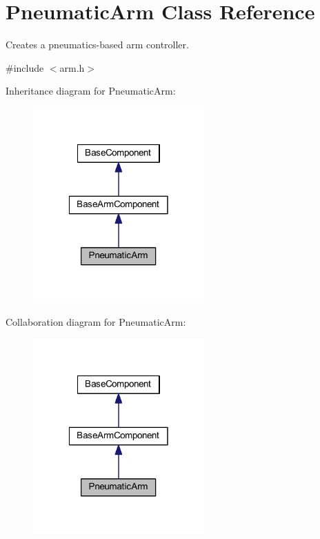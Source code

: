 \hypertarget{class_pneumatic_arm}{\section{\-Pneumatic\-Arm \-Class \-Reference}
\label{class_pneumatic_arm}
}


\-Creates a pneumatics-\/based arm controller.  




{\ttfamily \#include $<$arm.\-h$>$}



\-Inheritance diagram for \-Pneumatic\-Arm\-:\nopagebreak
\begin{figure}[H]
\begin{center}
\leavevmode
\includegraphics[width=186pt]{class_pneumatic_arm__inherit__graph}
\end{center}
\end{figure}


\-Collaboration diagram for \-Pneumatic\-Arm\-:\nopagebreak
\begin{figure}[H]
\begin{center}
\leavevmode
\includegraphics[width=186pt]{class_pneumatic_arm__coll__graph}
\end{center}
\end{figure}
